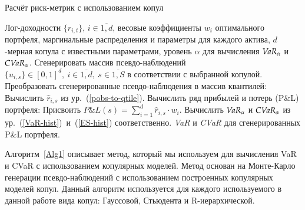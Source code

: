 \begin{algorithm}[t]
\caption{Расчёт риск-метрик с использованием копул}
\label{Alg1}
\begin{algorithmic}[1]
	\Require Лог-доходности $\{r_{i,t}\}$, $i \in \overline{1,d}$, весовые коэффициенты $w_i$ оптимального портфеля, маргинальные распределения и параметры для каждого актива, $d$-мерная копула с известными параметрами, уровень $\alpha$ для вычисления $\emph{VaR}_\alpha$ и $\emph{CVaR}_\alpha$.
	\label{Alg1:input}
	\State Сгенерировать массив псевдо-наблюдений 
	$\{\hat{u}_{i,s}\} \in [0, 1]^d, \ i \in \overline{1,d}, \ s \in \overline{1, S}$ 
	в соответствии с выбранной копулой.\label{Alg1:simulation}
	\State Преобразовать сгенерированные псевдо-наблюдения в массив квантилей:
	\label{Alg1:transform:start}
	        \State Вычислить $\hat{r}_{i,s}$ из ур.~(\ref{pobs-to-qtile}). \label{Alg1:transform}
	    \EndFor
	\EndFor \label{Alg1:transform:end}
	\State Вычислить ряд прибылей и потерь (P\&L) портфеля:
	\State Присвоить $\textit{P\&L}(s) = \sum_{i=1}^d \hat{r}_{i,s} \cdot w_i$. \label{Alg1:PnL}
	\EndFor
	\State Вычислить $\emph{VaR}_\alpha$ и $\emph{CVaR}_\alpha$ из ур.~(\ref{VaR-hist})~и~(\ref{ES-hist}) соответственно. \label{Alg1:risk-measures}
	\Ensure \textit{VaR} и \textit{CVaR} для сгенерированных P\&L портфеля.
\end{algorithmic}
\end{algorithm}

Алгоритм~\ref{Alg1} описывает метод, который мы используем для вычисления VaR и CVaR с использованием копулярных моделей.
Метод основан на Монте-Карло генерации псевдо-наблюдений с использованием построенных копулярных моделей копул.
Данный алгоритм используется для каждого используемого в данной работе вида копул: Гауссовой, Стьюдента и R-иерархической.

